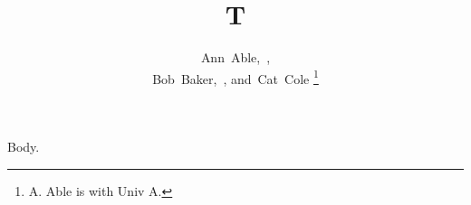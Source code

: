 \documentclass[journal]{IEEEtran}
\begin{document}
\title{T}
\author{Ann~Able,~, \\
        Bob~Baker,~, and~Cat~Cole
\thanks{A. Able is with Univ A.}}
\maketitle
Body.
\end{document}
